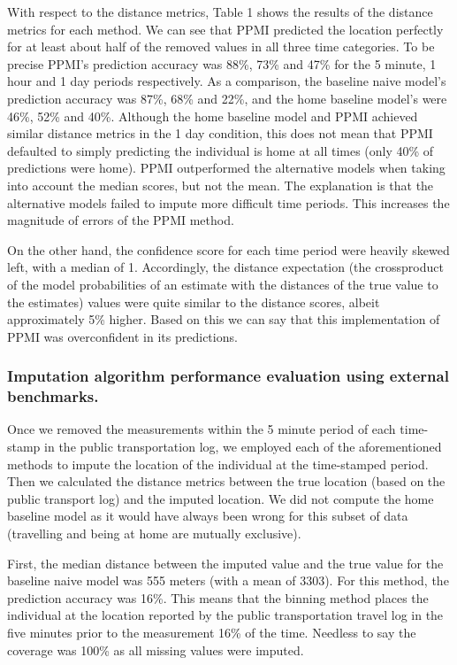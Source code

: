 \documentclass[man]{apa6}
\theoremstyle{definition}
\theoremstyle{definition}
\theoremstyle{definition}
\theoremstyle{remark}
\begin{document}
With respect to the distance metrics, Table 1 shows the results of the
distance metrics for each method. We can see that PPMI predicted the
location perfectly for at least about half of the removed values in all
three time categories. To be precise PPMI's prediction accuracy was
88\%, 73\% and 47\% for the 5 minute, 1 hour and 1 day periods
respectively. As a comparison, the baseline naive model's prediction
accuracy was 87\%, 68\% and 22\%, and the home baseline model's were
46\%, 52\% and 40\%. Although the home baseline model and PPMI achieved
similar distance metrics in the 1 day condition, this does not mean that
PPMI defaulted to simply predicting the individual is home at all times
(only 40\% of predictions were home). PPMI outperformed the alternative
models when taking into account the median scores, but not the mean. The
explanation is that the alternative models failed to impute more
difficult time periods. This increases the magnitude of errors of the
PPMI method.

On the other hand, the confidence score for each time period were
heavily skewed left, with a median of 1. Accordingly, the distance
expectation (the crossproduct of the model probabilities of an estimate
with the distances of the true value to the estimates) values were quite
similar to the distance scores, albeit approximately 5\% higher. Based
on this we can say that this implementation of PPMI was overconfident in
its predictions.

\subsubsection{Imputation algorithm performance evaluation using
external
benchmarks.}\label{imputation-algorithm-performance-evaluation-using-external-benchmarks.}

Once we removed the measurements within the 5 minute period of each
time-stamp in the public transportation log, we employed each of the
aforementioned methods to impute the location of the individual at the
time-stamped period. Then we calculated the distance metrics between the
true location (based on the public transport log) and the imputed
location. We did not compute the home baseline model as it would have
always been wrong for this subset of data (travelling and being at home
are mutually exclusive).

First, the median distance between the imputed value and the true value
for the baseline naive model was 555 meters (with a mean of 3303). For
this method, the prediction accuracy was 16\%. This means that the
binning method places the individual at the location reported by the
public transportation travel log in the five minutes prior to the
measurement 16\% of the time. Needless to say the coverage was 100\% as
all missing values were imputed.
\end{document}
